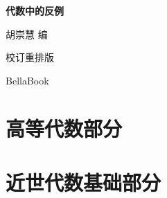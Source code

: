 \documentclass[UTF8,openany,11pt]{ctexbook}
\begin{document}
\frontmatter
\begin{titlepage}
  \centering
  \vspace*{24mm}
  {\sffamily\bfseries\fontsize{30}{38}\selectfont\color{BellaGreenDark} 代数中的反例\par}
  \vspace{8mm}
  {\Large 胡崇慧 编\par}
  \vfill
  {\large 校订重排版\par}
  \vspace{4mm}
  {\small\color{BellaGray}BellaBook\par}
  \vspace*{18mm}
\end{titlepage}



\tableofcontents
\mainmatter
\part{高等代数部分}





\part{近世代数基础部分}




\appendix
\end{document}
